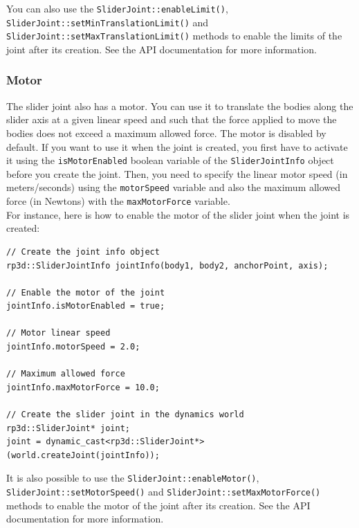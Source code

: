 \documentclass[a4paper,12pt]{article}
\begin{document}
    \vspace{0.6cm}

   \begin{sloppypar}
     You can also use the \texttt{SliderJoint::enableLimit()}, \texttt{SliderJoint::\-setMinTranslationLimit()} and \texttt{SliderJoint::setMaxTranslationLimit()} methods to
     enable the limits of the joint after its creation. See the API documentation for more information.
    \end{sloppypar}

    \subsubsection{Motor}

     The slider joint also has a motor. You can use it to translate the bodies along the slider axis at a given linear speed and such that the force applied to
     move the bodies does not exceed a maximum allowed force. The motor is disabled by default. If you want to use it when the joint is created, you first have to activate it using the
     \texttt{isMotorEnabled} boolean variable of the \texttt{SliderJointInfo} object before you create the joint. Then, you need to specify the linear motor speed (in meters/seconds)
     using the \texttt{motorSpeed} variable and also the maximum allowed force (in Newtons) with the \texttt{maxMotorForce} variable. \\

     For instance, here is how to enable the motor of the slider joint when the joint is created: \\

     \begin{lstlisting}
// Create the joint info object
rp3d::SliderJointInfo jointInfo(body1, body2, anchorPoint, axis);

// Enable the motor of the joint
jointInfo.isMotorEnabled = true;

// Motor linear speed
jointInfo.motorSpeed = 2.0;

// Maximum allowed force
jointInfo.maxMotorForce = 10.0;

// Create the slider joint in the dynamics world
rp3d::SliderJoint* joint;
joint = dynamic_cast<rp3d::SliderJoint*>(world.createJoint(jointInfo));
  \end{lstlisting}

     \vspace{0.6cm}

     \begin{sloppypar}
        It is also possible to use the \texttt{SliderJoint::enableMotor()}, \texttt{SliderJoint::setMotorSpeed()} and \texttt{SliderJoint::setMaxMotorForce()} methods to enable the
        motor of the joint after its creation. See the API documentation for more information.
     \end{sloppypar}
\end{document}
